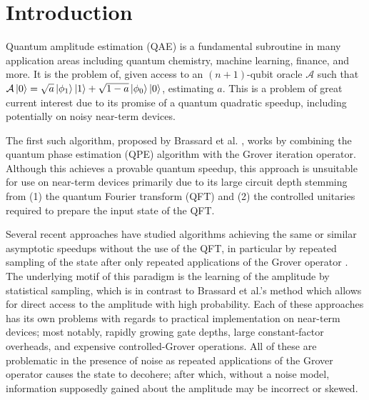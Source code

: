 
\section{Introduction}

Quantum amplitude estimation (QAE) is a fundamental subroutine in many application areas including quantum chemistry, machine learning, finance, and more. It is the problem of,\textbf{} given access to an $(n+1)$-qubit oracle $\mathcal{A}$ such that $\mathcal{A} \ket{0} = \sqrt{a} \ket{\phi_1} \ket{1} + \sqrt{1-a} \ket{\phi_0} \ket{0}$, estimating $a$. This is a problem of great current interest due to its promise of a quantum quadratic speedup, including potentially on noisy near-term devices.


The first such algorithm, proposed by Brassard et al. \cite{brassard_2002_q_amp_amp}, works by combining the quantum phase estimation (QPE) algorithm \cite{kitaev_1995_mmts_abelian_stab} with the Grover iteration operator. Although this achieves a provable quantum speedup, this approach is unsuitable for use on near-term devices primarily due to its large circuit depth stemming from (1) the quantum Fourier transform (QFT) \cite{coppersmith_2002_approximate_ft_for_q_factoring} and (2) the controlled unitaries required to prepare the input state of the QFT.

Several recent approaches have studied algorithms achieving the same or similar asymptotic speedups without the use of the QFT, in particular by repeated sampling of the state after only repeated applications of the Grover operator \cite{aaronson_2021_q_approx_counting, suzuki_2020_amp_without_phase, wie_2019_simpler_q_counting}. The underlying motif of this paradigm is the learning of the amplitude by statistical sampling, which is in contrast to Brassard et al.'s method which allows for direct access to the amplitude with high probability. Each of these approaches has its own problems with regards to practical implementation on near-term devices; most notably, rapidly growing gate depths, large constant-factor overheads, and expensive controlled-Grover operations. All of these are problematic in the presence of noise as repeated applications of the Grover operator causes the state to decohere; after which, without a noise model, information supposedly gained about the amplitude may be incorrect or skewed.

